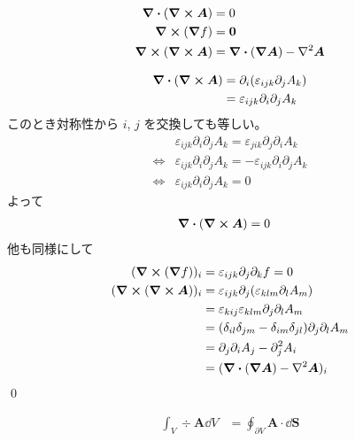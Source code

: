 \documentclass[uplatex,dvipdfmx,a4paper,11pt]{jlreq}
\makeatletter
\newcommand{\rot}{\curl}
\renewcommand{\AA}{\bm{A}}
\theoremstyle{definition}
\renewenvironment{proof}[1][\proofname]{\par
  \normalfont
  \topsep6\p@\@plus6\p@ \trivlist
  \item[\hskip\labelsep{\bfseries #1}\@addpunct{\bfseries}]\ignorespaces\quad\par
}{%
  \qed\endtrivlist\@endpefalse
}
\renewcommand\proofname{証明}
\makeatother
\begin{document}
\begin{theorem}[有名定理]
  \begin{align}
    \div{(\rot{\bm{A}})} & = 0                                          \\
    \rot{(\grad{f})}     & = \bm{0}                                     \\
    \rot{(\rot{\bm{A}})} & = \div{(\grad{\bm{A}})} - \laplacian{\bm{A}}
  \end{align}
\end{theorem}
\begin{proof}
  \begin{align}
    \div{(\rot{\bm{A}})} & = \partial_i(\varepsilon_{ijk}\partial_jA_k) \\
                         & = \varepsilon_{ijk}\partial_i\partial_jA_k
  \end{align}
  このとき対称性から $i$, $j$ を交換しても等しい。
  \begin{align}
         & \varepsilon_{ijk}\partial_i\partial_jA_k = \varepsilon_{jik}\partial_j\partial_iA_k  \\
    \iff & \varepsilon_{ijk}\partial_i\partial_jA_k = -\varepsilon_{ijk}\partial_i\partial_jA_k \\
    \iff & \varepsilon_{ijk}\partial_i\partial_jA_k = 0
  \end{align}
  よって
  \begin{align}
    \div{(\rot{\bm{A}})} & = 0
  \end{align}
  他も同様にして
  \begin{align}
    (\rot{(\grad{f})})_i     & = \varepsilon_{ijk}\partial_j\partial_kf = 0                               \\
    (\rot{(\rot{\bm{A}})})_i & = \varepsilon_{ijk}\partial_j(\varepsilon_{klm}\partial_lA_m)              \\
                             & = \varepsilon_{kij}\varepsilon_{klm}\partial_j\partial_lA_m                \\
                             & = (\delta_{il}\delta_{jm} - \delta_{im}\delta_{jl})\partial_j\partial_lA_m \\
                             & = \partial_j\partial_iA_j - \partial_j^2A_i                                \\
                             & = (\div{(\grad{\bm{A}})} - \laplacian{\bm{A}})_i
  \end{align}
\end{proof}

\begin{theorem}
  \begin{align}
    \int_V\div{\AA}\dd{V} & = \oint_{\partial V}\AA\cdot\dd{\bm{S}}
  \end{align}
\end{theorem}
\end{document}
